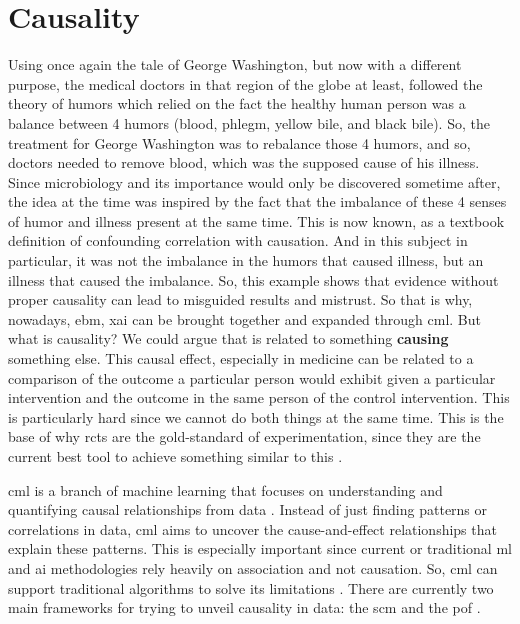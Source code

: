 \section{Causality}\label{causalml}
Using once again the tale of George Washington, but now with a different purpose, the medical doctors in that region of the globe at least, followed the theory of humors which relied on the fact the healthy human person was a balance between 4 humors (blood, phlegm, yellow bile, and black bile). So, the treatment for George Washington was to rebalance those 4 humors, and so, doctors needed to remove blood, which was the supposed cause of his illness. Since microbiology and its importance would only be discovered sometime after, the idea at the time was inspired by the fact that the imbalance of these 4 senses of humor and illness present at the same time.
This is now known, as a textbook definition of confounding correlation with causation. And in this subject in particular, it was not the imbalance in the humors that caused illness, but an illness that caused the imbalance.
So, this example shows that evidence without proper causality can lead to misguided results and mistrust.
So that is why, nowadays, \ac{ebm}, \ac{xai} can be brought together and expanded through \ac{cml}.
But what is causality? We could argue that is related to something \textbf{causing} something else. This causal effect, especially in medicine can be related to a comparison of the outcome a particular person would exhibit given a particular intervention and the outcome in the same person of the control intervention. This is particularly hard since we cannot do both things at the same time.  This is the base of why \acp{rct} are the gold-standard of experimentation, since they are the current best tool to achieve something similar to this \cite{10.7551/mitpress/14244.001.0001}.

\ac{cml} is a branch of machine learning that focuses on understanding and quantifying causal relationships from data \cite{hernanDefinitionCausalEffect2004}. Instead of just finding patterns or correlations in data, \ac{cml} aims to uncover the cause-and-effect relationships that explain these patterns.
This is especially important since current or traditional \ac{ml} and \ac{ai} methodologies rely heavily on association and not causation. So, \ac{cml} can support traditional algorithms to solve its limitations \cite{pearlTheoreticalImpedimentsMachine2018}.
There are currently two main frameworks for trying to unveil causality in data: the \ac{scm}  and the \ac{pof} \cite{shiLearningCausalEffects2022b}.

